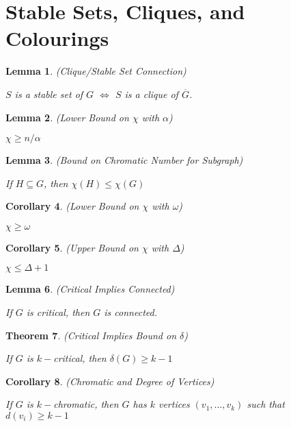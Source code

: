 \documentclass[12pt]{amsart}
\newtheorem{thm}{Theorem}
\newtheorem{lem}[thm]{Lemma}
\newtheorem{cor}[thm]{Corollary}
\theoremstyle{definition}
\begin{document}
\section{Stable Sets, Cliques, and Colourings}

\begin{lem} (Clique/Stable Set Connection)

$S$ is a stable set of $G$ $\Longleftrightarrow$ $S$ is a clique of $\overline{G}$.
\end{lem}


\begin{lem} (Lower Bound on $\chi$ with $\alpha$)

$\chi \geq n/\alpha$
\end{lem}


\begin{lem} (Bound on Chromatic Number for Subgraph)

If $H \subseteq G$, then $\chi(H) \leq \chi(G)$
\end{lem}


\begin{cor} (Lower Bound on $\chi$ with $\omega$)

$\chi \geq \omega$
\end{cor}


\begin{cor} (Upper Bound on $\chi$ with $\Delta$)

$\chi \leq \Delta+1$
\end{cor}


\begin{lem} (Critical Implies Connected)

If $G$ is critical, then $G$ is connected.
\end{lem}


\begin{thm} (Critical Implies Bound on $\delta$)

If $G$ is $k-$critical, then $\delta(G)\geq k-1$
\end{thm}


\begin{cor} (Chromatic and Degree of Vertices)

If $G$ is $k-$chromatic, then $G$ has $k$ vertices $(v_1,\ldots, v_k)$ such that $d(v_i)\geq k-1$
\end{cor}
\end{document}
